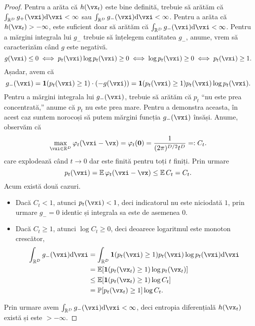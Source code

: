 \documentclass[../../book-main_ro.tex]{subfiles}
\begin{document}
\begin{proof}
    Pentru a arăta că \(h(\vx_{t})\) este bine definită, trebuie să arătăm că \(\int_{\R^{D}}g_{+}(\vxi)\odif{\vxi} < \infty\) sau \(\int_{\R^{D}}g_{-}(\vxi) \odif{\vxi} < \infty\). Pentru a arăta că \(h(\vx_{t}) > -\infty\), este suficient doar să arătăm că \(\int_{\R^{D}}g_{-}(\vxi)\odif{\vxi} < \infty\). Pentru a mărgini integrala lui \(g_{-}\) trebuie să înțelegem cantitatea \(g_{-}\), anume, vrem să caracterizăm când \(g\) este negativă.
    \begin{equation}
        g(\vxi) \leq 0 \iff p_{t}(\vxi)\log p_{t}(\vxi) \geq 0 \iff \log p_{t}(\vxi) \geq 0 \iff p_{t}(\vxi) \geq 1.
    \end{equation}
    Așadar, avem că 
    \begin{equation}
        g_{-}(\vxi) = \indvar(p_{t}(\vxi) \geq 1)\cdot (-g(\vxi)) = \indvar(p_{t}(\vxi) \geq 1)p_{t}(\vxi)\log p_{t}(\vxi).
    \end{equation}
    Pentru a mărgini integrala lui \(g_{-}(\vxi)\), trebuie să arătăm că \(p_{t}\) ``nu este prea concentrată,'' anume că \(p_{t}\) nu este prea mare. Pentru a demonstra aceasta, în acest caz suntem norocoși să putem mărgini funcția \(g_{-}(\vxi)\) însăși. Anume, observăm că 
    \begin{equation}
        \max_{\vxi \in \R^{D}}\phi_{t}(\vxi - \vx) = \phi_{t}(\vzero) = \frac{1}{(2\pi)^{D/2}t^{D}} =: C_{t}.
    \end{equation}
    care explodează când \(t \to 0\) dar este finită pentru toți \(t\) finiți. Prin urmare 
    \begin{equation}
        p_{t}(\vxi) = \Ex \phi_{t}(\vxi - \vx) \leq \Ex C_{t} = C_{t}.
    \end{equation}
    Acum există două cazuri.
    \begin{itemize}
        \item Dacă \(C_{t} < 1\), atunci \(p_{t}(\vxi) < 1\), deci indicatorul nu este niciodată \(1\), prin urmare \(g_{-} = 0\) identic și integrala sa este de asemenea \(0\).
        \item Dacă \(C_{t} \geq 1\), atunci \(\log C_{t} \geq 0\), deci deoarece logaritmul este monoton crescător,
        \begin{align}
            \int_{\R^{D}}g_{-}(\vxi)\odif{\vxi}
            &= \int_{\R^{D}}\indvar(p_{t}(\vxi) \geq 1)p_{t}(\vxi)\log p_{t}(\vxi)\odif{\vxi}  \\ 
            &= \Ex[\indvar(p_{t}(\vx_{t}) \geq 1)\log p_{t}(\vx_{t})]  \\ 
            &\leq \Ex[\indvar(p_{t}(\vx_{t}) \geq 1) \log C_{t}] \\ 
            &= \Pr[p_{t}(\vx_{t}) \geq 1]\log C_{t}.
        \end{align}
    \end{itemize}
    Prin urmare avem \(\int_{\R^{D}}g_{-}(\vxi)\odif{\vxi} < \infty\), deci entropia diferențială \(h(\vx_{t})\) există și este \(> -\infty\).


\end{proof}
\end{document}
